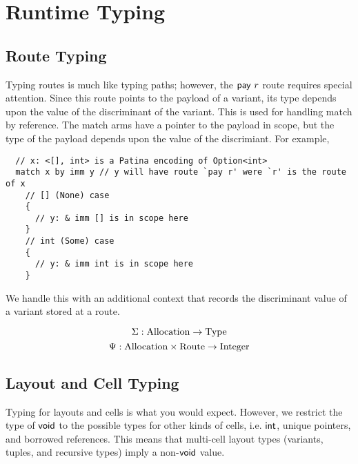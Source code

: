 \section*{Runtime Typing}
\subsection*{Route Typing}
Typing routes is much like typing paths; however, the $\mathsf{pay}~{r}$ route requires
special attention. Since this route points to the payload of a variant,
its type depends upon the value of the discriminant of the variant.
This is used for handling match by reference.
The match arms have a pointer to the payload in scope, but the type of the
payload depends upon the value of the discrimiant.
For example,
\begin{verbatim}
  // x: <[], int> is a Patina encoding of Option<int>
  match x by imm y // y will have route `pay r' were `r' is the route of x
    // [] (None) case
    {
      // y: & imm [] is in scope here
    }
    // int (Some) case
    {
      // y: & imm int is in scope here
    }
\end{verbatim}

We handle this with an additional context that records the discriminant value
of a variant stored at a route. 

$$ \Sigma : \mathrm{Allocation} \to \mathrm{Type}$$
$$ \Psi : \mathrm{Allocation} \times \mathrm{Route} \to \mathrm{Integer} $$



\subsection*{Layout and Cell Typing}
Typing for layouts and cells is what you would expect.
However, we restrict the type of $\mathsf{void}$ to the possible types for other
kinds of cells, i.e. $\mathsf{int}$, unique pointers, and borrowed references.
This means that multi-cell layout types (variants, tuples, and recursive types) imply
a non-$\mathsf{void}$ value.
\newline

